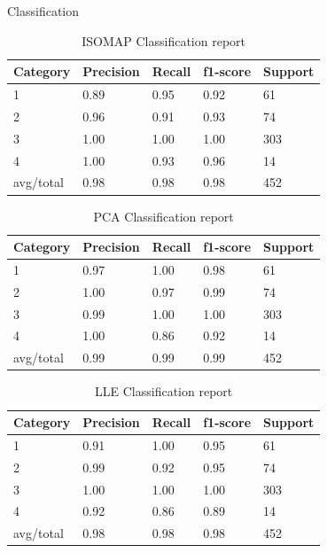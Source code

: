 \documentclass[final,hyperref={pdfpagelabels=false}]{beamer}
\begin{document}
\begin{frame}[t]
\begin{columns}[t]
\begin{column}{.465\textwidth}
\begin{block}{Classification}
\begin{table}
\begin{tabular}{l l l l l}
\toprule
\textbf{Category} & \textbf{Precision} & \textbf{Recall} & \textbf{f1-score} & \textbf{Support}\\
\midrule
1   &    0.89  &   0.95  &   0.92   &    61 \\
2   &    0.96  &   0.91	 &   0.93   &    74 \\
3   &    1.00  &   1.00	 &   1.00   &    303 \\
4   &    1.00  &   0.93	 &   0.96   &    14 \\
\midrule
avg/total   &    0.98  &   0.98 & 0.98 & 452 \\
\bottomrule
\end{tabular}
\caption{ISOMAP Classification report}
\end{table}

\begin{table}
\begin{tabular}{l l l l l}
\toprule
\textbf{Category} & \textbf{Precision} & \textbf{Recall} & \textbf{f1-score} & \textbf{Support}\\
\midrule
        1 &	0.97  &	   1.00	 &    0.98  &	   61\\ 
	2 &	1.00  &	   0.97	 &    0.99  &	   74\\ 
	3 &	0.99  &	   1.00	 &    1.00  &	  303\\ 
	4 &	1.00  &	   0.86	 &    0.92  &	   14\\ 
\midrule
avg/total & 0.99 &     0.99  &    0.99  &     452 \\
\bottomrule
\end{tabular}
\caption{PCA Classification report}
\end{table}

\begin{table}
\begin{tabular}{l l l l l}
\toprule
\textbf{Category} & \textbf{Precision} & \textbf{Recall} & \textbf{f1-score} & \textbf{Support}\\
\midrule
        1  &	0.91  &	   1.00	 &    0.95  &	   61\\ 
	2  &	0.99  &	   0.92	 &    0.95  &	   74\\ 
	3  &	1.00  &	   1.00	 &    1.00  &	  303\\ 
	4  &	0.92  &	   0.86	 &    0.89  &	   14\\ 

\midrule
avg/total & 0.98  &    0.98  &    0.98   &    452 \\
\bottomrule
\end{tabular}
\caption{LLE Classification report}
\end{table}





\end{block}
\end{column}
\end{columns}
\end{frame}
\end{document}
